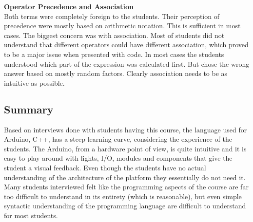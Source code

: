 \textbf{Operator Precedence and Association}\\
Both terms were completely foreign to the students. 
Their perception of precedence were mostly based on arithmetic notation. 
This is sufficient in most cases. 
The biggest concern was with association. 
Most of students did not understand that different operators could have different association, which proved to be a major issue when presented with code. 
In most cases the students understood which part of the expression was calculated first. 
But chose the wrong answer based on mostly random factors. 
Clearly association needs to be as intuitive as possible.

\subsection{Summary}
Based on interviews done with students having this course, the language used for Arduino, C++, has a steep learning curve, considering the experience of the students. 
The Arduino, from a hardware point of view, is quite intuitive and it is easy to play around with lights, I/O, modules and components that give the student a visual feedback. 
Even though the students have no actual understanding of the architecture of the platform they essentially do not need it. 
Many students interviewed felt like the programming aspects of the course are far too difficult to understand in its entirety (which is reasonable), but even simple syntactic understanding of the programming language are difficult to understand for most students. 



